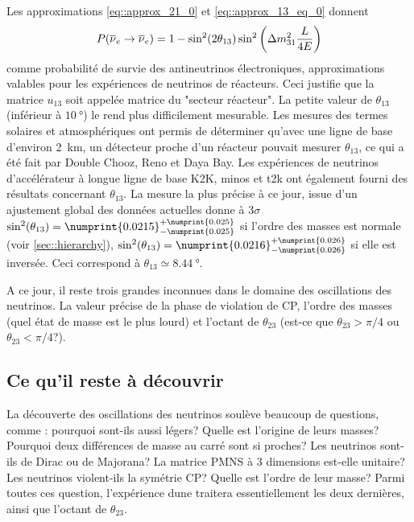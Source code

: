       Les approximations \eqref{eq::approx_21_0} et \eqref{eq::approx_13_eq_0} donnent
      \begin{equation}\label{eq::e_approx_reacteur}
        P(\overline{\nu}_e\to\overline{\nu}_e) = 1-\sin^2(2\theta_{13})\sin^2\left(\Delta m^2_{31}\frac{L}{4E}\right)
      \end{equation}
      comme probabilité de survie des antineutrinos électroniques, approximations valables pour les expériences de neutrinos de réacteurs. Ceci justifie que la matrice $u_{13}$ soit appelée matrice du "secteur réacteur". La petite valeur de $\theta_{13}$ (inférieur à $\SI{10}{\degree}$) le rend plus difficilement mesurable. Les mesures des termes solaires et atmosphériques ont permis de déterminer qu'avec une ligne de base d'environ \SI{2}{\kilo\meter}, un détecteur proche d'un réacteur pouvait mesurer $\theta_{13}$, ce qui a été fait par Double Chooz\cite{Crespo-Anadon2014}, Reno\cite{Collaboration2010} et Daya Bay\cite{An2014}. Les expériences de neutrinos d'accélérateur à longue ligne de base K2K\cite{Collaboration2006a}, \gls{minos}\cite{Collaboration2014} et \gls{t2k}\cite{Abe2018} ont également fourni des résultats concernant $\theta_{13}$. La mesure la plus précise à ce jour, issue d'un ajustement global des données actuelles donne à $3\sigma$ $\sin^2(\theta_{13})=\numprint{0.0215}^{+\numprint{0.025}}_{-\numprint{0.025}}$\cite{pdg2018} si l'ordre des masses est normale (voir \autoref{sec::hierarchy}), $\sin^2(\theta_{13})=\numprint{0.0216}^{+\numprint{0.026}}_{-\numprint{0.026}}$ si elle est inversée. Ceci correspond à $\theta_{13}\simeq\SI{8.44}{\degree}$.

    A ce jour, il reste trois grandes inconnues dans le domaine des oscillations des neutrinos. La valeur précise de la phase de violation de CP, l'ordre des masses (quel état de masse est le plus lourd) et l'octant de $\theta_{23}$ (est-ce que $\theta_{23}>\pi/4$ ou $\theta_{23}<\pi/4$?).

    \subsection{Ce qu'il reste à découvrir}\label{sec::a_decouvrir}

      La découverte des oscillations des neutrinos soulève beaucoup de questions, comme : pourquoi sont-ils aussi légers? Quelle est l'origine de leurs masses? Pourquoi deux différences de masse au carré sont si proches? Les neutrinos sont-ils de Dirac ou de Majorana? La matrice PMNS à 3 dimensions est-elle unitaire? Les neutrinos violent-ils la symétrie CP? Quelle est l'ordre de leur masse? Parmi toutes ces question, l'expérience \gls{dune} traitera essentiellement les deux dernières, ainsi que l'octant de $\theta_{23}$.

